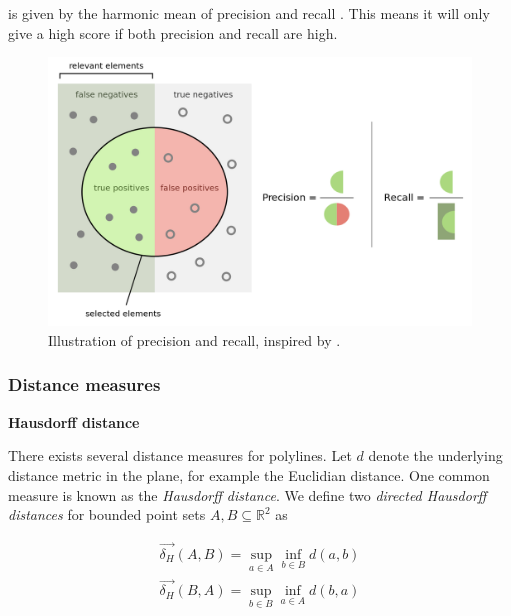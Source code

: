 is given by the harmonic mean of precision and recall \citep{precisionrecall}. This means it will only give a high score if both precision and recall are high.

\begin{figure}[H]
    \centering
    \includegraphics[width=13cm]{Figures/Theory/Precisionrecall.png}
    \caption{Illustration of precision and recall, inspired by \citep{wiki:prerecall}.}
    \label{fig:theory/precrec}
\end{figure}

\subsubsection{Distance measures}
\label{chp:theory.sec:evaluation.sub:stat.sub:dist}


\textbf{Hausdorff distance}

There exists several distance measures for polylines. Let $d$ denote the underlying distance metric in the plane, for example the Euclidian distance. One common measure is known as the \textit{Hausdorff distance}. We define two \textit{directed Hausdorff distances} for bounded point sets $A, B \subseteq \mathbb{R}^2$ as

\begin{equation}
\begin{split}
    \label{eq:dhausdorff}
    \overrightarrow{\delta_H}(A,B) = \sup_{a\in A} \inf_{b\in B} d(a, b) \\
    \overrightarrow{\delta_H}(B,A) = \sup_{b\in B} \inf_{a\in A} d(b, a)
\end{split}
\end{equation}

